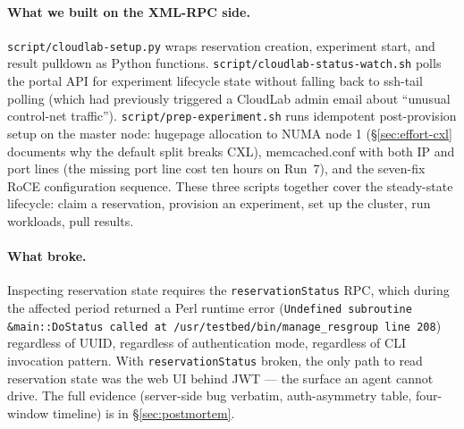 \documentclass[11pt,a4paper]{article}
\begin{document}
\paragraph{What we built on the XML-RPC side.} \texttt{script/cloudlab-setup.py} wraps reservation creation, experiment start, and result pulldown as Python functions. \texttt{script/cloudlab-status-watch.sh} polls the portal API for experiment lifecycle state without falling back to ssh-tail polling (which had previously triggered a CloudLab admin email about ``unusual control-net traffic''). \texttt{script/prep-experiment.sh} runs idempotent post-provision setup on the master node: hugepage allocation to NUMA node 1 (\S\ref{sec:effort-cxl} documents why the default split breaks CXL), memcached.conf with both IP and port lines (the missing port line cost ten hours on Run~7), and the seven-fix RoCE configuration sequence. These three scripts together cover the steady-state lifecycle: claim a reservation, provision an experiment, set up the cluster, run workloads, pull results.

\paragraph{What broke.} Inspecting reservation state requires the \texttt{reservationStatus} RPC, which during the affected period returned a Perl runtime error (\texttt{Undefined subroutine \&main::DoStatus called at /usr/testbed/bin/manage\_resgroup line 208}) regardless of UUID, regardless of authentication mode, regardless of CLI invocation pattern. With \texttt{reservationStatus} broken, the only path to read reservation state was the web UI behind JWT --- the surface an agent cannot drive. The full evidence (server-side bug verbatim, auth-asymmetry table, four-window timeline) is in §\ref{sec:postmortem}.
\end{document}
